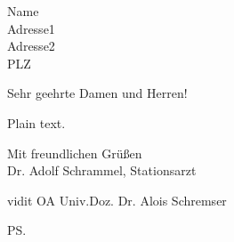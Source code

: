 \documentclass[fromalign=center,fromrule=aftername,fromphone,fromemail,fontsize=10pt,DIV=13]{scrlttr2}
\begin{document}
\begin{letter}{Name\\
Adresse1\\
Adresse2\\
PLZ}


\opening{Sehr geehrte Damen und Herren!}


Plain text.

\closing{Mit freundlichen Grüßen\vspace{2em}\\ Dr. Adolf Schrammel, Stationsarzt}



vidit OA Univ.Doz. Dr. Alois Schremser

\ps
{}

\end{letter}
\end{document}
